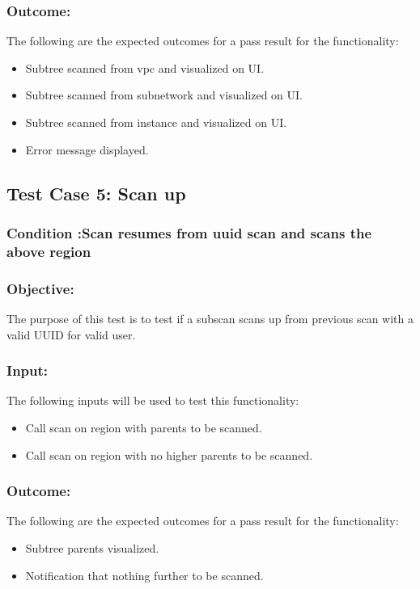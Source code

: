 \documentclass[hidelinks,a4paper,12pt]{article}
\begin{document}
\subsubsection{Outcome: }
The following are the expected outcomes for a pass result for the functionality:
\begin{itemize}
\item Subtree scanned from vpc and visualized on UI.
\item Subtree scanned from subnetwork and visualized on UI.
\item Subtree scanned from instance and visualized on UI.
\item Error message displayed.
\end{itemize}


\subsection{Test Case 5: Scan up }
\subsubsection{Condition :Scan resumes from uuid scan and scans the above region}
\subsubsection{Objective:} The purpose of this test is to test if a subscan scans up from previous scan with a valid UUID for valid user.

\subsubsection{Input:}
 The following inputs will be used to test this functionality:
\begin{itemize}
  \item Call scan on region with parents to be scanned.
   \item Call scan on region with no higher parents to be scanned.

\end{itemize}

\subsubsection{Outcome: }
The following are the expected outcomes for a pass result for the functionality:
\begin{itemize}
\item Subtree parents visualized.
\item Notification that nothing further to be scanned.

\end{itemize}
\end{document}
